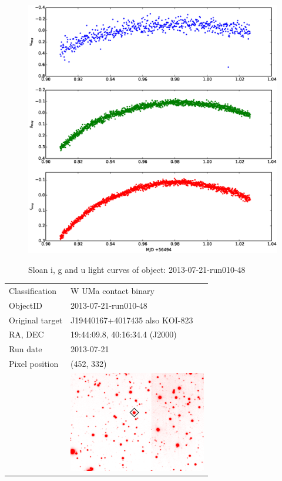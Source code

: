 
\newpage

\begin{figure}
  \includegraphics[width=120mm]{images/2013-07-21-run010-48_lightcurve.eps} 
  \label{fig:2005-05-10-run012}
  \caption{Sloan i, g and u light curves of object: 2013-07-21-run010-48}
\end{figure}

  \begin{tabular}{l l}
  Classification & {W UMa} contact binary \\
  ObjectID & 2013-07-21-run010-48 \\
  Original target & J19440167+4017435 also KOI-823 \\
  RA, DEC & 19:44:09.8, 40:16:34.4 (J2000) \\
  Run date & 2013-07-21 \\
  Pixel position & (452, 332) \\
       & \includegraphics[width=60mm]{images/2013-07-21-run010-48.png} \\
  \end{tabular}
 
